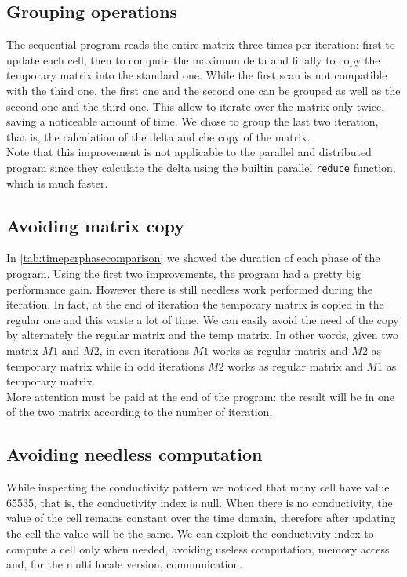 \documentclass{article}
\begin{document}
\subsection{Grouping operations}
The sequential program reads the entire matrix three times per iteration: first to update each cell, then to compute the maximum delta and finally to copy the temporary matrix into the standard one. While the first scan is not compatible with the third one, the first one and the second one can be grouped as well as the second one and the third one. This allow to iterate over the matrix only twice, saving a noticeable amount of time. We chose to group the last two iteration, that is, the calculation of the delta and che copy of the matrix. \\
Note that this improvement is not applicable to the parallel and distributed program since they calculate the delta using the builtin parallel \texttt{reduce} function, which is much faster.

\subsection{Avoiding matrix copy}
In \autoref{tab:timeperphasecomparison} we showed the duration of each phase of the program. Using the first two improvements, the program had a pretty big performance gain. However there is still needless work performed during the iteration. In fact, at the end of iteration the temporary matrix is copied in the regular one and this waste a lot of time. We can easily avoid the need of the copy by alternately the regular matrix and the temp matrix. In other words, given two matrix $M1$ and $M2$, in even iterations $M1$ works as regular matrix and $M2$ as temporary matrix while in odd iterations $M2$ works as regular matrix and $M1$ as temporary matrix. \\
More attention must be paid at the end of the program: the result will be in one of the two matrix according to the number of iteration.

\subsection{Avoiding needless computation}
While inspecting the conductivity pattern we noticed that many cell have value 65535, that is, the conductivity index is null. When there is no conductivity, the value of the cell remains constant over the time domain, therefore after updating the cell the value will be the same. We can exploit the conductivity index to compute a cell only when needed, avoiding useless computation, memory access and, for the multi locale version, communication.
\end{document}
